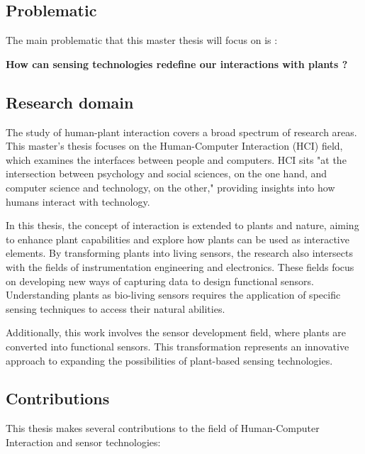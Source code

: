 \subsection{Problematic}

The main problematic that this master thesis will focus on is :

\begin{center}
    \textbf{How can sensing technologies redefine our interactions with plants ?}\\
\end{center}

\subsection{Research domain}

The study of human-plant interaction covers a broad spectrum of research areas. This master's thesis focuses on the Human-Computer Interaction (HCI) field, which examines the interfaces between people and computers. HCI sits "at the intersection between psychology and social sciences, on the one hand, and computer science and technology, on the other," \cite{carrollHUMANCOMPUTERINTERACTIONPsychology} providing insights into how humans interact with technology.

In this thesis, the concept of interaction is extended to plants and nature, aiming to enhance plant capabilities and explore how plants can be used as interactive elements. By transforming plants into living sensors, the research also intersects with the fields of instrumentation engineering and electronics. These fields focus on developing new ways of capturing data to design functional sensors. Understanding plants as bio-living sensors requires the application of specific sensing techniques to access their natural abilities.

Additionally, this work involves the sensor development field, where plants are converted into functional sensors. This transformation represents an innovative approach to expanding the possibilities of plant-based sensing technologies.


\subsection{Contributions}

This thesis makes several contributions to the field of Human-Computer Interaction and sensor technologies:

